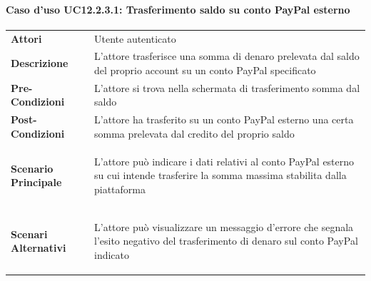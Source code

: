 \paragraph{Caso d'uso UC12.2.3.1: Trasferimento saldo su conto PayPal esterno}
\label{UC12_2_3_1}
\begin{minipage}{\linewidth}
	\begin{tabular}{ l | p{11cm}}
		\hline
		\rowcolor{Gray}
		\multicolumn{2}{c}{UC12.2.3.1 - Trasferimento saldo su conto PayPal esterno} \\
		\hline
		\textbf{Attori} & Utente autenticato \\
		\textbf{Descrizione} & L'attore trasferisce una somma di denaro prelevata dal saldo del proprio account su un conto PayPal specificato\\
		\textbf{Pre-Condizioni} & L'attore si trova nella schermata di trasferimento somma dal saldo\\
		\textbf{Post-Condizioni} & L'attore ha trasferito su un conto PayPal esterno una certa somma prelevata dal credito del proprio saldo \\
		\textbf{Scenario Principale} & 
		\begin{enumerate*}[label=(\arabic*.),itemjoin={\newline}]
			\item L'attore può indicare i dati relativi al conto PayPal esterno su cui intende trasferire la somma massima stabilita dalla piattaforma
		\end{enumerate*}\\
		\textbf{Scenari Alternativi} & 
		\begin{enumerate*}[label=(\arabic*.),itemjoin={\newline}]
			\item L'attore può visualizzare un messaggio d'errore che segnala l'esito negativo del trasferimento di denaro sul conto PayPal indicato
		\end{enumerate*}\\
	\end{tabular}
\end{minipage}
